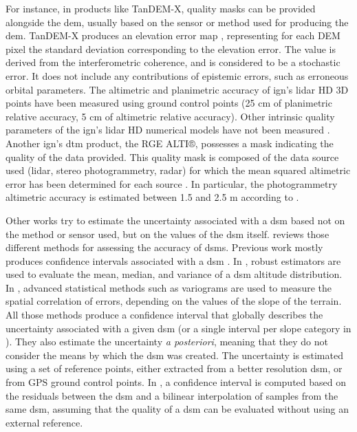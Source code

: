 For instance, in products like TanDEM-X, quality masks can be provided alongside the \acrshort{dem}, usually based on the sensor or method used for producing the \acrshort{dem}. TanDEM-X produces an elevation error map \cite{wessel_tandem-x_2018}, representing for each DEM pixel the standard deviation corresponding to the elevation error. The value is derived from the interferometric coherence, and is considered to be a stochastic error. It does not include any contributions of epistemic errors, such as erroneous orbital parameters. The altimetric and planimetric accuracy of \acrshort{ign}'s \acrshort{lidar} HD 3D points have been measured using ground control points (25 cm of planimetric relative accuracy, 5 cm of altimetric relative accuracy). Other intrinsic quality parameters of the \acrshort{ign}'s \acrshort{lidar} HD numerical models have not been measured \cite{ign_lidar_2024}. Another \acrshort{ign}'s \acrshort{dtm} product, the RGE ALTI®, possesses a mask indicating the quality of the data provided. This quality mask is composed of the data source used (\acrshort{lidar}, stereo photogrammetry, \acrshort{radar}) for which the mean squared altimetric error has been determined for each source \cite{ign_rge_alti_2013}. In particular, the photogrammetry altimetric accuracy is estimated between 1.5 and 2.5 m according to \cite{ign_bd-topo_2013}.

Other works try to estimate the uncertainty associated with a \acrshort{dsm} based not on the method or sensor used, but on the values of the \acrshort{dsm} itself. \cite{mesa-mingorance_accuracy_2020} reviews those different methods for assessing the accuracy of \acrshort{dsm}s. Previous work mostly produces confidence intervals associated with a \acrshort{dsm} \cite{oksanen_digital_2006,panagiotakis_validation_2018,deschamps-berger_apport_2021}. In \cite{wang_robust_2015}, robust estimators are used to evaluate the mean, median, and variance of a \acrshort{dsm} altitude distribution. In \cite{hugonnet_uncertainty_2022}, advanced statistical methods such as variograms are used to measure the spatial correlation of errors, depending on the values of the slope of the terrain. All those methods produce a confidence interval that globally describes the uncertainty associated with a given \acrshort{dsm} (or a single interval per slope category in \cite{hugonnet_uncertainty_2022}). They also estimate the uncertainty \textit{a posteriori}, meaning that they do not consider the means by which the \acrshort{dsm} was created. The uncertainty is estimated using a set of reference points, either extracted from a better resolution \acrshort{dsm}, or from GPS ground control points. In \cite{wang_robust_2015}, a confidence interval is computed based on the residuals between the \acrshort{dsm} and a bilinear interpolation of samples from the same \acrshort{dsm}, assuming that the quality of a \acrshort{dsm} can be evaluated without using an external reference.
  
